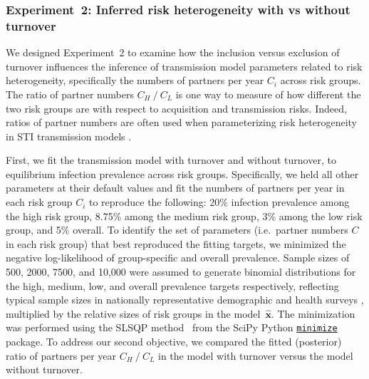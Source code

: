 \subsubsection{Experiment~2: Inferred risk heterogeneity with vs without turnover}
\label{sss:exp-infer}
We designed Experiment~2 to examine how
the inclusion versus exclusion of turnover influences
the inference of transmission model parameters related to risk heterogeneity,
specifically the numbers of partners per year $C_i$ across risk groups.
The ratio of partner numbers $C_H~/~C_L$
is one way to measure of how different the two risk groups are
with respect to acquisition and transmission risks.
Indeed, ratios of partner numbers are often used when parameterizing 
risk heterogeneity in STI transmission models \citep{Mishra2012}.
\par
First, we fit the transmission model with turnover and without turnover,
to equilibrium infection prevalence across risk groups.
Specifically, we held all other parameters at their default values and
fit the numbers of partners per year in each risk group $C_i$
to reproduce the following:
20\% infection prevalence among the high risk group,
8.75\% among the medium risk group,
3\% among the low risk group,
and 5\% overall.
To identify the set of parameters (i.e.\ partner numbers $C$ in each risk group)
that best reproduced the fitting targets, we minimized
the negative log-likelihood of group-specific and overall prevalence.
Sample sizes of 500, 2000, 7500, and 10,000 were assumed to generate binomial distributions
for the high, medium, low, and overall prevalence targets respectively,
reflecting typical sample sizes in
nationally representative demographic and health surveys \citep{DHS},
multiplied by the relative sizes of risk groups in the model~$\bm{\hat{x}}$.
The minimization was performed using
the SLSQP method~\citep{Kraft1988} from the SciPy Python
\href{https://docs.scipy.org/doc/scipy/reference/generated/scipy.optimize.minimize.html}
{\texttt{minimize}} package.
To address our second objective, we compared
the fitted (posterior) ratio of partners per year $C_H~/~C_L$
in the model with turnover versus the model without turnover.
